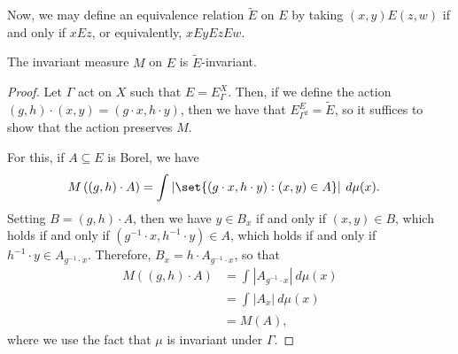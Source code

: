 \documentclass[10pt]{mypackage}
\begin{document}
Now, we may define an equivalence relation $ \widetilde{E} $ on $E$ by taking $\left( x,y \right)E\left( z,w \right)$ if and only if $xEz$, or equivalently, $xEyEzEw$.
\begin{proposition}
  The invariant measure $M$ on $E$ is $\widetilde{E}$-invariant.
\end{proposition}
\begin{proof}
  Let $\Gamma$ act on $X$ such that $E = E_{\Gamma}^X$. Then, if we define the action $\left( g,h \right)\cdot \left( x,y \right) = \left( g\cdot x,h\cdot y \right)$, then we have that $ E^{E}_{\Gamma^2} = \widetilde{E} $, so it suffices to show that the action preserves $M$.

  For this, if $A\subseteq E$ is Borel, we have
  \begin{align*}
    M\left( \left( g,h \right)\cdot A \right) &= \int_{}^{} \left\vert \set{\left( g\cdot x,h\cdot y \right) : \left( x,y \right)\in A} \right\vert\:d\mu(x).
  \end{align*}
  Setting $B = \left( g,h \right)\cdot A$, then we have $y\in B_x$ if and only if $\left( x,y \right)\in B$, which holds if and only if $\left( g^{-1}\cdot x,h^{-1}\cdot y \right)\in A$, which holds if and only if $h^{-1}\cdot y\in A_{g^{-1}\cdot x}$. Therefore, $B_x = h\cdot A_{g^{-1}\cdot x}$, so that
  \begin{align*}
    M\left( \left( g,h \right)\cdot A \right) &= \int_{}^{} \left\vert A_{g^{-1}\cdot x} \right\vert\:d\mu(x)\\
                                              &= \int_{}^{} \left\vert A_x \right\vert\:d\mu(x)\\
                                              &= M\left( A \right),
  \end{align*}
  where we use the fact that $\mu$ is invariant under $\Gamma$.
\end{proof}
\end{document}
